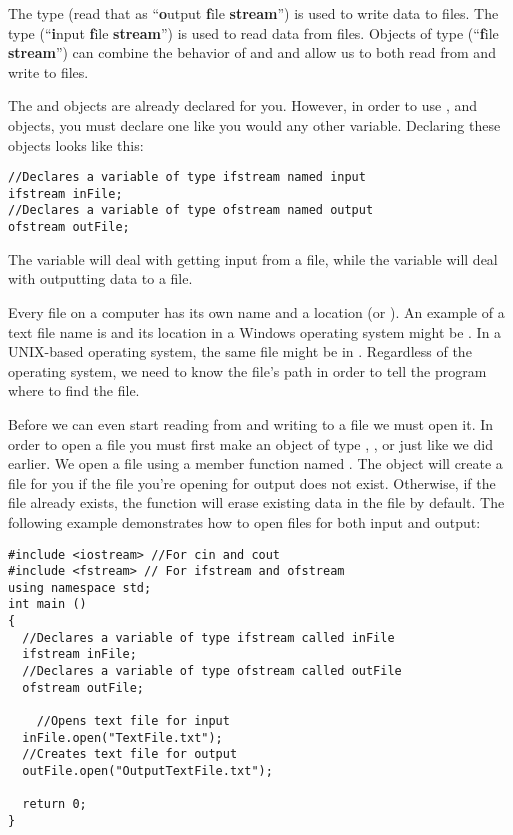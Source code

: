 The  type (read that as ``\textbf{o}utput \textbf{f}ile \textbf{stream}'') is used to write data to files. 
The  type (``\textbf{i}nput \textbf{f}ile \textbf{stream}'') is used to read data from files. 
Objects of type  (``\textbf{f}ile \textbf{stream}'') can combine the behavior of  and  and allow us to both read from and write to files.

The  and  objects are already declared for you. 
However, in order to use ,  and  objects, you must declare one like you would any other variable. 
Declaring these objects looks like this:

\noindent\begin{minipage}{\linewidth}\begin{lstlisting}
//Declares a variable of type ifstream named input
ifstream inFile; 
//Declares a variable of type ofstream named output
ofstream outFile; 
\end{lstlisting}\end{minipage}

The variable  will deal with getting input from a file, while the variable  will deal with outputting data to a file. 

Every file on a computer has its own name and a location (or ).
An example of a text file name is  and its location in a Windows operating system might be . 
In a UNIX-based operating system, the same file might be in . 
Regardless of the operating system, we need to know the file's path in order to tell the program where to find the file. 


Before we can even start reading from and writing to a file we must open it. 
In order to open a file you must first make an object of type , , or  just like we did earlier. 
We open a file using a member function named . 
The  object will create a file for you if the file you're opening for output does not exist.
Otherwise, if the file already exists, the  function will erase existing data in the file by default. 
The following example demonstrates how to open files for both input and output:

\noindent\begin{minipage}{\linewidth}\begin{lstlisting}
#include <iostream> //For cin and cout 
#include <fstream> // For ifstream and ofstream
using namespace std;
int main ()
{
  //Declares a variable of type ifstream called inFile
  ifstream inFile; 
  //Declares a variable of type ofstream called outFile
  ofstream outFile; 
	
	//Opens text file for input
  inFile.open("TextFile.txt"); 
  //Creates text file for output
  outFile.open("OutputTextFile.txt"); 
	
  return 0;
}
\end{lstlisting}\end{minipage}

